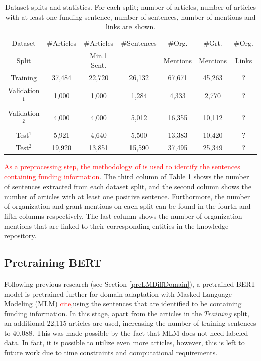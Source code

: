 \documentclass{report}
\theoremstyle{definition}
\theoremstyle{remark}
\begin{document}
\begin{table}[h!]
    \centering
    \begin{tabular}{ccccccc}
    Dataset & \#Articles & \#Articles & \#Sentences &\#Org.& \#Grt.& \#Org. \\
    Split & & Min.1 Sent.& &Mentions&Mentions&Links \\
    \hline
    Training  & 37,484 &22,720&26,132& 67,671 &45,263 &?\\
    Validation$^{1}$ & 1,000&1,000&1,284&4,333&2,770&?\\
    Validation$^{2}$ & 4,000&4,000&5,012&16,355 & 10,112&?\\
    Test$^{1}$ & 5,921 &4,640 & 5,500 & 13,383 & 10,420 &? \\
    Test$^{2}$ & 19,920 & 13,851 & 15,590 &37,495&25,349& ?\\
    \end{tabular}
    \caption{Dataset splits and statistics. For each split; number of articles, number of articles with at least one funding sentence, number of sentences, number of mentions and links are shown.}
    \label{tab:datasets}
\end{table}

\textcolor{red}{As a preprocessing step, the methodology of \cite{ElsPaper} is used to identify the sentences containing funding information}. The third column of Table \ref{tab:datasets} shows the number of sentences extracted from each dataset split, and the second column shows the number of articles with at least one positive sentence. Furthormore, the number of organization and grant mentions on each split can be found in the fourth and fifth columns respectively. The last column shows the number of organization mentions that are linked to their corresponding entities in the knowledge repository.
\subsection{Pretraining BERT}
\label{sec:datapretrain}
Following previous research (see Section \ref{preLMDiffDomain}), a pretrained BERT model \cite{BERT} is pretrained further for domain adaptation with Masked Language Modeling (MLM) \textcolor{red}{cite},using the sentences that are identified to be containing funding information. In this stage, apart from the articles in the $Training$ split, an additional 22,115 articles are used, increasing the number of training sentences to 40,088. This was made possible by the fact that MLM does not need labeled data. In fact, it is possible to utilize even more articles, however, this is left to future work due to time constraints and computational requirements.   
\end{document}
